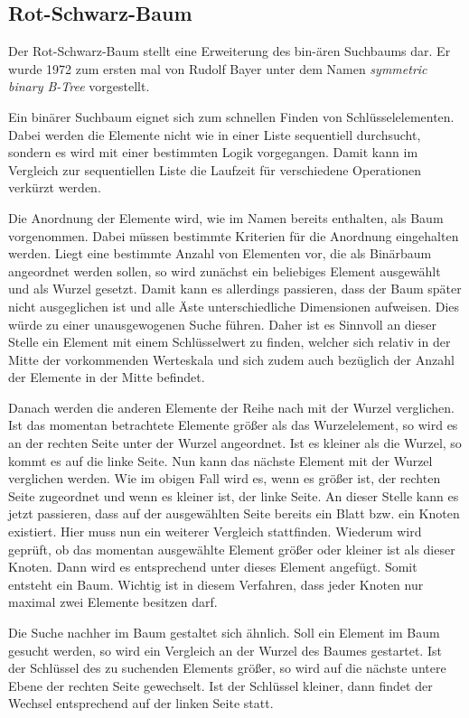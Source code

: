 \subsection{Rot-Schwarz-Baum}\label{s:rb_tree}
Der Rot-Schwarz-Baum stellt eine Erweiterung des bin-ären Suchbaums dar. Er wurde 1972 zum ersten mal von Rudolf Bayer unter dem Namen  \textit{symmetric binary B-Tree} vorgestellt.

Ein binärer Suchbaum eignet sich zum schnellen Finden von Schlüsselelementen. Dabei werden die Elemente nicht wie in einer Liste sequentiell durchsucht, sondern es wird mit einer bestimmten Logik vorgegangen.
Damit kann im Vergleich zur sequentiellen Liste die Laufzeit für verschiedene Operationen verkürzt werden.

Die Anordnung der Elemente wird, wie im Namen bereits enthalten, als Baum vorgenommen. Dabei müssen bestimmte Kriterien für die Anordnung eingehalten werden. Liegt eine bestimmte Anzahl von Elementen vor, die als Binärbaum angeordnet werden sollen, so wird zunächst ein beliebiges Element ausgewählt und als Wurzel gesetzt. Damit kann es allerdings passieren, dass der Baum später nicht ausgeglichen ist und alle Äste unterschiedliche Dimensionen aufweisen. Dies würde zu einer unausgewogenen Suche führen. Daher ist es Sinnvoll an dieser Stelle ein Element mit einem Schlüsselwert zu finden, welcher sich relativ in der Mitte der vorkommenden Werteskala und sich zudem auch bezüglich der Anzahl der Elemente in der Mitte befindet.

Danach werden die anderen Elemente der Reihe nach mit der Wurzel verglichen. Ist das momentan betrachtete Elemente größer als das Wurzelelement, so wird es an der rechten Seite unter der Wurzel angeordnet. Ist es kleiner als die Wurzel, so kommt es auf die linke Seite. Nun kann das nächste Element mit der Wurzel verglichen werden. Wie im obigen Fall wird es, wenn es größer ist, der rechten Seite zugeordnet und wenn es kleiner ist, der linke Seite. An dieser Stelle kann es jetzt passieren, dass auf der ausgewählten Seite bereits ein Blatt bzw. ein Knoten existiert. Hier muss nun ein weiterer Vergleich stattfinden. Wiederum wird geprüft, ob das momentan ausgewählte Element größer oder kleiner ist als dieser Knoten. Dann wird es entsprechend unter dieses Element angefügt. Somit entsteht ein Baum. Wichtig ist in diesem Verfahren, dass jeder Knoten nur maximal zwei Elemente besitzen darf. 

Die Suche nachher im Baum gestaltet sich ähnlich. Soll ein Element im Baum gesucht werden, so wird ein Vergleich an der Wurzel des Baumes gestartet. Ist der Schlüs\-sel des zu suchenden Elements größer, so wird auf die nächste untere Ebene der rechten Seite gewechselt. Ist der Schlüssel kleiner, dann findet der Wechsel entsprechend auf der linken Seite statt. 

